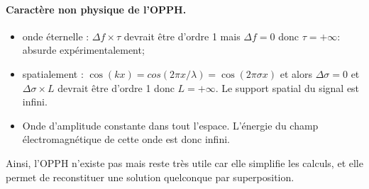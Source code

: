 \paragraph{Caractère non physique de l'OPPH.}
\begin{itemize}
    \item onde éternelle : $\Delta f\times\tau$ devrait être d'ordre 1 mais $\Delta f=0$ donc $\tau=+\infty$: absurde expérimentalement;
    \item spatialement : $\cos(kx)=cos(2\pi x/\lambda)=\cos(2\pi\sigma x)$ et alors $\Delta\sigma=0$ et $\Delta\sigma\times L$ devrait être d'ordre 1 donc $L=+\infty$. Le support spatial du signal est infini.
    \item Onde d'amplitude constante dans tout l'espace. L'énergie du champ électromagnétique de cette onde est donc infini.
\end{itemize}

Ainsi, l'OPPH n'existe pas mais reste très utile car elle simplifie les calculs, et elle permet de reconstituer une solution quelconque par superposition.